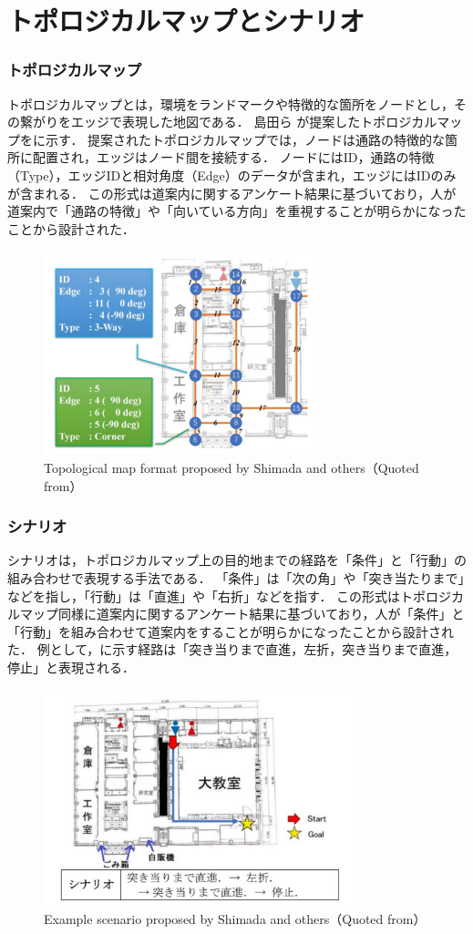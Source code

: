 \section{トポロジカルマップとシナリオ}
\subsubsection{トポロジカルマップ}
トポロジカルマップとは，環境をランドマークや特徴的な箇所をノードとし，その繋がりをエッジで表現した地図である．
島田ら \cite{shimada2020}が提案したトポロジカルマップをに示す．
提案されたトポロジカルマップでは，ノードは通路の特徴的な箇所に配置され，エッジはノード間を接続する．
ノードにはID，通路の特徴（Type），エッジIDと相対角度（Edge）のデータが含まれ，エッジにはIDのみが含まれる．
この形式は道案内に関するアンケート結果に基づいており，人が道案内で「通路の特徴」や「向いている方向」を重視することが明らかになったことから設計された．

\begin{figure}[htbp]
  \centering
   \includegraphics[width=80mm]{images/pdf/shimada/topo.pdf}
   \caption{Topological map format proposed by Shimada and others（Quoted from\cite{shimada2020}）}
   \label{fig:shimada_topo}
\end{figure}

\clearpage
\subsubsection{シナリオ}
シナリオは，トポロジカルマップ上の目的地までの経路を「条件」と「行動」の組み合わせで表現する手法である．
「条件」は「次の角」や「突き当たりまで」などを指し，「行動」は「直進」や「右折」などを指す．
この形式はトポロジカルマップ同様に道案内に関するアンケート結果に基づいており，人が「条件」と「行動」を組み合わせて道案内をすることが明らかになったことから設計された．
例として，に示す経路は「突き当りまで直進，左折，突き当りまで直進，停止」と表現される．

\begin{figure}[htbp]
  \centering
   \includegraphics[width=90mm]{images/pdf/shimada/scenario.pdf}
   \caption{Example scenario proposed by Shimada and others（Quoted from\cite{shimada2020}）}
   \label{fig:shimada_scenario}
\end{figure}